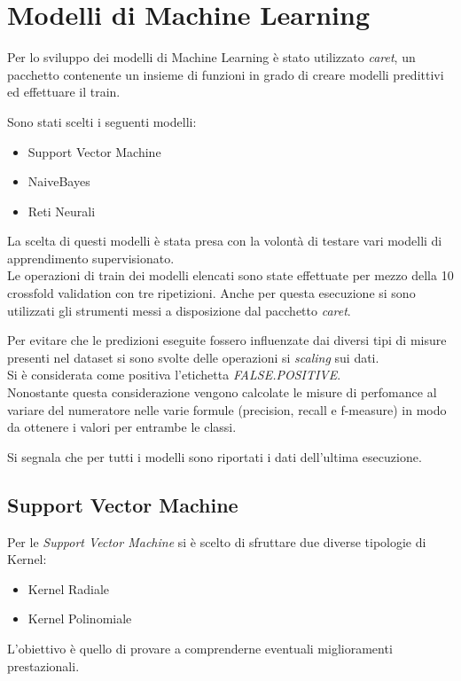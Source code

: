 \chapter{Modelli di Machine Learning}
Per lo sviluppo dei modelli di Machine Learning è stato utilizzato
\textit{caret}, un pacchetto contenente un insieme di funzioni in grado di 
creare modelli predittivi ed effettuare il train.

Sono stati scelti i seguenti modelli:
\begin{itemize}
    \item Support Vector Machine
    \item NaiveBayes
    \item Reti Neurali
\end{itemize}
La scelta di questi modelli è stata presa con la volontà di testare 
vari modelli di apprendimento supervisionato.\\
    
Le operazioni di train dei modelli elencati sono state effettuate 
per mezzo della 10 crossfold validation con tre ripetizioni. 
Anche per questa esecuzione si sono utilizzati 
gli strumenti messi a disposizione dal pacchetto \textit{caret}.

Per evitare che le predizioni eseguite fossero influenzate dai diversi tipi di misure 
presenti nel dataset si sono svolte delle operazioni si \textit{scaling} sui dati.\\

Si è considerata come positiva l'etichetta \textit{FALSE.POSITIVE}. \\
Nonostante questa considerazione vengono calcolate le misure di perfomance
al variare del numeratore nelle varie formule (precision, recall e 
f-measure) in modo da ottenere i valori per entrambe le classi.

\begin{mdframed}[backgroundcolor=yellow!20] 
    Si segnala che per tutti i modelli sono riportati i dati dell'ultima esecuzione.
\end{mdframed}

\section{Support Vector Machine}
Per le \textit{Support Vector Machine} si è scelto di sfruttare due diverse tipologie di Kernel:
\begin{itemize}
    \item Kernel Radiale
    \item Kernel Polinomiale
\end{itemize}
L'obiettivo è quello di provare a comprenderne eventuali miglioramenti prestazionali.

